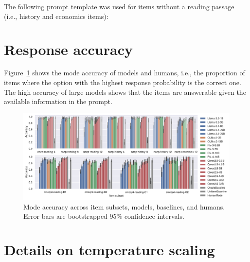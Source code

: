 \documentclass[11pt]{article}
\begin{document}
\noindent The following prompt template was used for items without a reading passage (i.e., history and economics items):

\noindent{}

\section{Response accuracy}
\label{sec:appendix-accuracy}

Figure~\ref{fig:accuracy} shows the mode accuracy of models and humans, i.e., the proportion of items where the option with the highest response probability is the correct one. The high accuracy of large models shows that the items are answerable given the available information in the prompt.

\begin{figure}[h]
  \centering
  \includegraphics[width=\textwidth]{figures/accuracy.pdf}
  \caption{Mode accuracy across item subsets, models, baselines, and humans. Error bars are bootstrapped 95\% confidence intervals.}
  \label{fig:accuracy}
\end{figure}

\section{Details on temperature scaling}
\label{sec:appendix-temperature}
\end{document}
